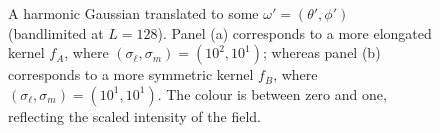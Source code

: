 \begin{figure}[htp]
	\centering
	\hfill
	\caption{
		A harmonic Gaussian translated to some \(\omega'=(\theta',\phi')\) (bandlimited at \(L=128\)).
		Panel (a) corresponds to a more elongated kernel \(f_{A}\), where \((\sigma_{\ell},\sigma_{m}) = (10^{2}, 10^{1})\); whereas panel (b) corresponds to a more symmetric kernel \(f_{B}\), where \((\sigma_{\ell},\sigma_{m}) = (10^{1}, 10^{1})\).
		The colour is between zero and one, reflecting the scaled intensity of the field.
	}\label{fig:chapter2_translated}
\end{figure}
